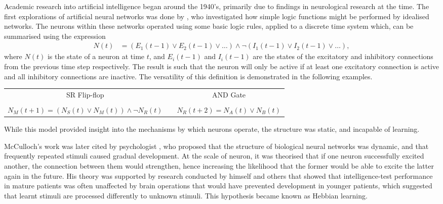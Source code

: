 Academic research into artificial intelligence began around the 1940's,
primarily due to findings in neurological research at the time.
The first explorations of artificial neural networks was done by
\cite{McCulloch:1943:Logical}, who investigated how simple logic functions
might be performed by idealised networks.
The neurons within these networks operated using some basic logic rules, applied
to a discrete time system which, can be summarised using the expression
\begin{align*}
    N(t) &= (E_1(t-1) \vee E_2(t-1) \vee \dots)
        \wedge \neg(I_1(t-1) \vee I_2(t-1) \vee \dots),
\end{align*}
where $N(t)$ is the state of a neuron at time $t$, and $E_i(t-1)$ and $I_i(t-1)$
are the states of the excitatory and inhibitory connections from the previous
time step respectively.
The result is such that the neuron will only be active if at least one
excitatory connection is active and all inhibitory connections are inactive.
The versatility of this definition is demonstrated in the following examples.
\begin{center}
    \begin{tabular}{ccc}
        SR Flip-flop & & AND Gate\\
         & & \\
        $\displaystyle N_M(t+1) = (N_S(t) \vee N_M(t)) \wedge\neg N_R(t)$ &
        &
        $\displaystyle N_R(t+2) = N_A(t) \vee N_B(t)$\\
    \end{tabular}
    \parbox{0.9\textwidth}{%
    }
\end{center}
While this model provided insight into the mechanisms by which neurons operate,
the structure was static, and incapable of learning.



McCulloch's work was later cited by psychologist \cite{Hebb:1949:Organization},
who proposed that the structure of biological neural networks was dynamic, and
that frequently repeated stimuli caused gradual development.
At the scale of neuron, it was theorised that if one neuron successfully
excited another, the connection between them would strengthen, hence
increasing the likelihood that the former would be able to excite the latter
again in the future.
His theory was supported by research conducted by himself and others that showed
that intelligence-test performance in mature patients was often unaffected by
brain operations that would have prevented development in younger patients,
which suggested that learnt stimuli are processed differently to unknown
stimuli.
This hypothesis became known as Hebbian learning.



